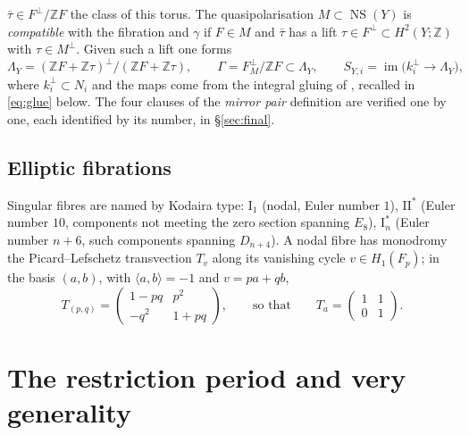 \documentclass[11pt]{article}
\newcommand{\Z}{\mathbb Z}
\newcommand{\NS}{\operatorname{NS}}
\newcommand{\im}{\operatorname{im}}
\newcommand{\II}{\mathrm{II}}
\newcommand{\I}{\mathrm{I}}
\theoremstyle{definition}
\theoremstyle{remark}
\begin{document}
\(\bar\tau\in F^\perp/\Z F\) the class of this torus. The
quasipolarisation \(M\subset\NS(Y)\) is \emph{compatible} with the
fibration and \(\gamma\) \cite[Definition~4.21]{GT} if \(F\in M\) and
\(\bar\tau\) has a lift \(\tau\in F^\perp\subset H^2(Y;\Z)\) with
\(\tau\in M^\perp\). Given such a lift one forms
\begin{equation}\label{eq:LambdaY}
 \Lambda_Y=(\Z F+\Z\tau)^\perp/(\Z F+\Z\tau),\qquad
 \Gamma=F^\perp_M/\Z F\subset\Lambda_Y,\qquad
 S_{Y,i}=\im\bigl(k_i^\perp\longrightarrow\Lambda_Y\bigr),
\end{equation}
where \(k_i^\perp\subset N_i\) and the maps come from the integral
gluing of \cite[Propositions~4.18 and~4.20]{GT}, recalled in
\eqref{eq:glue} below. The four clauses of the \emph{mirror pair} definition
\cite[Definition~5.1]{GT} are verified one by one, each identified by
its number, in \S\ref{sec:final}.

\subsection{Elliptic fibrations}

Singular fibres are named by Kodaira type: \(\I_1\) (nodal, Euler
number \(1\)), \(\II^*\) (Euler number \(10\), components not meeting
the zero section spanning \(E_8\)), \(\I_n^*\) (Euler number \(n+6\),
such components spanning \(D_{n+4}\)). A nodal fibre has monodromy the Picard--Lefschetz
transvection \(T_v\) along its vanishing cycle \(v\in H_1(F_p)\); in
the basis \((a,b)\), with \(\langle a,b\rangle=-1\) and \(v=pa+qb\),
\begin{equation}\label{eq:PL}
 T_{(p,q)}=\left(\begin{smallmatrix}1-pq&p^2\\-q^2&1+pq\end{smallmatrix}\right),
 \qquad\text{so that}\qquad
 T_a=\left(\begin{smallmatrix}1&1\\0&1\end{smallmatrix}\right).
\end{equation}

\section{The restriction period and very generality}\label{sec:period}
\end{document}
